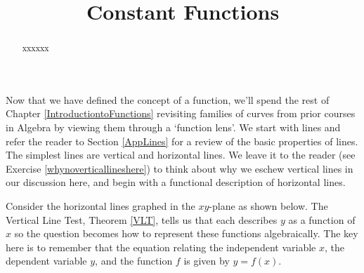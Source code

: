 \documentclass{ximera}
\title{Constant Functions} \license{CC BY-NC-SA 4.0}
\begin{document}
\begin{abstract} xxxxxx
\end{abstract}
\maketitle



Now that we have defined the concept of a function, we'll spend the rest of Chapter \ref{IntroductiontoFunctions} revisiting families of curves from prior courses in Algebra by viewing them through a `function lens'.  We start with lines and refer the reader to Section \ref{AppLines} for a review of the basic properties of lines.  The simplest lines are vertical and horizontal lines.  We leave it to the reader (see Exercise \ref{whynoverticallineshere}) to think about why we eschew vertical lines in our discussion here, and begin with a functional description of horizontal lines.  



Consider the horizontal lines graphed in the $xy$-plane as shown below. The Vertical Line Test, Theorem \ref{VLT}, tells us that each describes $y$ as a function of $x$ so the question becomes how to represent these functions algebraically. The key here is to remember that the equation relating the independent variable $x$,  the dependent variable  $y$, and the function $f$ is given by $y = f(x)$.
\end{document}
